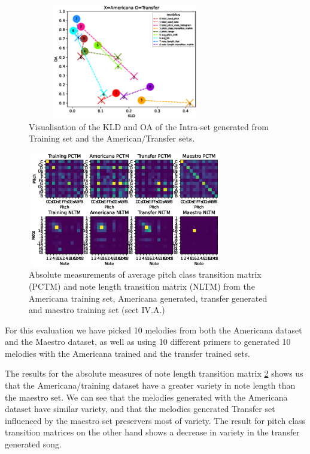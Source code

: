 \documentclass{IEEEtran}
\begin{document}
            \begin{figure}
                \centering
                \includegraphics[width=8.5cm, height=5cm]{gen_intra_gen_training_inter}
                \caption{Visualisation of the KLD and OA of the Intra-set generated from Training set and the American/Transfer sets.}
                \label{fig:gen_intra_gen_training_inter}
            \end{figure} 
            
            \begin{figure}
                \centering
                \includegraphics[width=8.5cm, height=5cm]{PCTMNLTM.eps}
                \caption{Absolute measurements of average pitch class transition matrix (PCTM) and note length transition matrix (NLTM) from the Americana training set, Americana generated, transfer generated and maestro training set (sect IV.A.)}
                \label{fig:absoluteNLTMPCTM}
            \end{figure} 
         
            For this evaluation we have picked 10 melodies from both the Americana dataset and the Maestro dataset, as well as using 10 different primers to generated 10 melodies with the Americana trained and the transfer trained sets. 

            The results for the absolute measures of note length transition matrix \ref{fig:absoluteNLTMPCTM} shows us that the Americana/training dataset have a greater variety in note length than the maestro set. We can see that the melodies generated with the Americana dataset have similar variety, and that the melodies generated Transfer set influenced by the maestro set preservers most of variety. The result for pitch class transition matrices on the other hand shows a decrease in variety in the transfer generated song.
\end{document}
